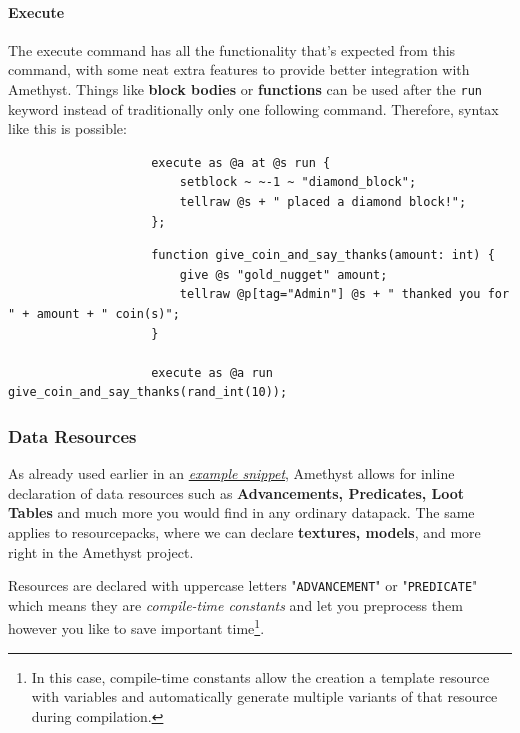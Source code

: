 \documentclass[12pt]{article}
\begin{document}
            \paragraph{Execute} The execute command has all the functionality that's expected from this command, with some neat extra features to provide better integration with Amethyst. Things like \textbf{block bodies} or \textbf{functions} can be used after the \lstinline{run} keyword instead of traditionally only one following command. Therefore, syntax like this is possible:
            
                \begin{lstlisting}
                    execute as @a at @s run {
                        setblock ~ ~-1 ~ "diamond_block";
                        tellraw @s + " placed a diamond block!";
                    };
                \end{lstlisting}
                
                 \begin{lstlisting}
                    function give_coin_and_say_thanks(amount: int) {
                        give @s "gold_nugget" amount;
                        tellraw @p[tag="Admin"] @s + " thanked you for " + amount + " coin(s)";
                    }
                    
                    execute as @a run give_coin_and_say_thanks(rand_int(10));
                \end{lstlisting}
            
        \subsubsection{Data Resources} \label{sec:resources}
            As already used earlier in an \textit{\hyperref[fig:first_data_resource]{example snippet}}, Amethyst allows for inline declaration of data resources such as \textbf{Advancements, Predicates, Loot Tables} and much more you would find in any ordinary datapack. The same applies to resourcepacks, where we can declare \textbf{textures, models}, and more right in the Amethyst project.
            
            Resources are declared with uppercase letters "\lstinline{ADVANCEMENT}" or "\lstinline{PREDICATE}" which means they are \textit{compile-time constants} and let you preprocess them however you like to save important time\footnote{In this case, compile-time constants allow the creation a template resource with variables and automatically generate multiple variants of that resource during compilation.}.
            
\end{document}
